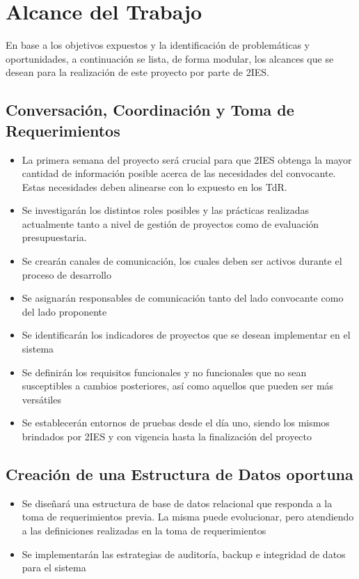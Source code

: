 \section{Alcance del Trabajo}

En base a los objetivos expuestos y la identificación de problemáticas y oportunidades, a continuación se lista, de forma modular, los alcances que se desean para la realización de este proyecto por parte de 2IES.

\subsection{Conversación, Coordinación y Toma de Requerimientos}

\begin{itemize}
    \item La primera semana del proyecto será crucial para que 2IES obtenga la mayor cantidad de información posible acerca de las necesidades del convocante. Estas necesidades deben alinearse con lo expuesto en los TdR.
    \item Se investigarán los distintos roles posibles y las prácticas realizadas actualmente tanto a nivel de gestión de proyectos como de evaluación presupuestaria.
    \item Se crearán canales de comunicación, los cuales deben ser activos durante el proceso de desarrollo
    \item Se asignarán responsables de comunicación tanto del lado convocante como del lado proponente
    \item Se identificarán los indicadores de proyectos que se desean implementar en el sistema
    \item Se definirán los requisitos funcionales y no funcionales que no sean susceptibles a cambios posteriores, así como aquellos que pueden ser más versátiles 
    \item Se establecerán entornos de pruebas desde el día uno, siendo los mismos brindados por 2IES y con vigencia hasta la finalización del proyecto
\end{itemize}

\subsection{Creación de una Estructura de Datos oportuna}
\begin{itemize}
    \item Se diseñará una estructura de base de datos relacional que responda a la toma de requerimientos previa. La misma puede evolucionar, pero atendiendo a las definiciones realizadas en la toma de requerimientos 
    \item Se implementarán las estrategias de auditoría, backup e integridad de datos para el sistema
\end{itemize}

